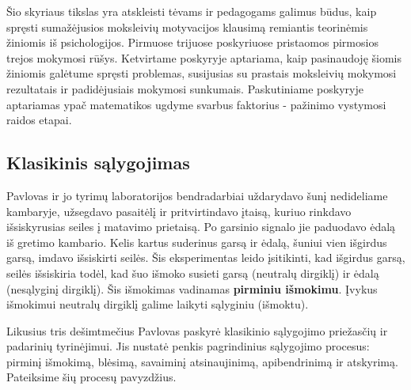 \documentclass{article}
\begin{document}
Šio skyriaus tikslas yra atskleisti tėvams ir pedagogams galimus būdus, kaip spręsti sumažėjusios moksleivių motyvacijos klausimą remiantis teorinėmis žiniomis iš psichologijos. Pirmuose trijuose poskyriuose pristaomos pirmosios trejos mokymosi rūšys. Ketvirtame poskyryje aptariama, kaip pasinaudoję šiomis žiniomis galėtume spręsti problemas, susijusias su prastais moksleivių mokymosi rezultatais ir padidėjusiais mokymosi sunkumais. Paskutiniame poskyryje aptariamas ypač matematikos ugdyme svarbus faktorius - pažinimo vystymosi raidos etapai. 

\subsection{Klasikinis sąlygojimas}\hypertarget{klasikinis}{}
Pavlovas ir jo tyrimų laboratorijos bendradarbiai uždarydavo šunį nedideliame kambaryje, užsegdavo pasaitėlį ir pritvirtindavo įtaisą, kuriuo rinkdavo išsiskyrusias seiles į matavimo prietaisą. Po garsinio signalo jie paduodavo ėdalą iš gretimo kambario. Kelis kartus suderinus garsą ir ėdalą, šuniui vien išgirdus garsą, imdavo išsiskirti seilės. Šis eksperimentas leido įsitikinti, kad išgirdus garsą, seilės išsiskiria todėl, kad šuo išmoko susieti garsą (neutralų dirgiklį) ir ėdalą (nesąlyginį dirgiklį). Šis išmokimas vadinamas \textbf{pirminiu išmokimu}. Įvykus išmokimui neutralų dirgiklį galime laikyti sąlyginiu (išmoktu).

Likusius tris dešimtmečius Pavlovas paskyrė klasikinio sąlygojimo priežasčių ir padarinių tyrinėjimui. Jis nustatė penkis pagrindinius sąlygojimo procesus: pirminį išmokimą, blėsimą, savaiminį atsinaujinimą, apibendrinimą ir atskyrimą. Pateiksime šių procesų pavyzdžius.
\end{document}
